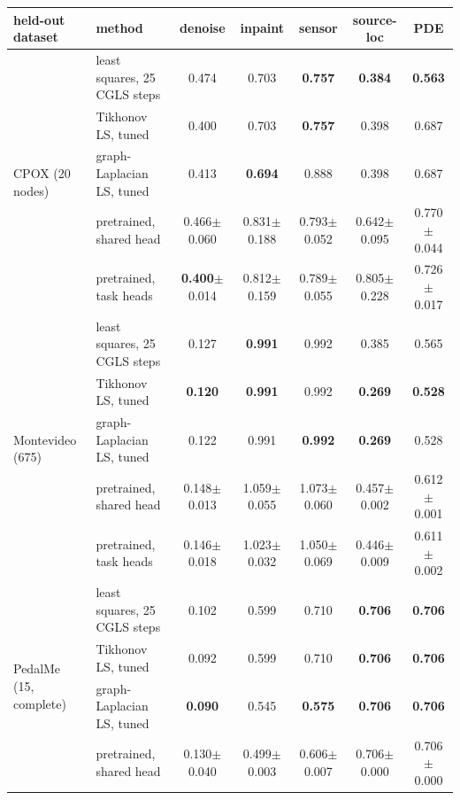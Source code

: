\begin{tabular}{llccccc}
\toprule
held-out dataset & method & denoise & inpaint & sensor & source-loc & PDE \\
\midrule
\multirow{5}{*}{CPOX (20 nodes)} & least squares, 25 CGLS steps & 0.474 & 0.703 & \textbf{0.757} & \textbf{0.384} & \textbf{0.563} \\
 & Tikhonov LS, tuned & 0.400 & 0.703 & \textbf{0.757} & 0.398 & 0.687 \\
 & graph-Laplacian LS, tuned & 0.413 & \textbf{0.694} & 0.888 & 0.398 & 0.687 \\
 & pretrained, shared head & 0.466{\scriptsize$\pm$0.060} & 0.831{\scriptsize$\pm$0.188} & 0.793{\scriptsize$\pm$0.052} & 0.642{\scriptsize$\pm$0.095} & 0.770{\scriptsize$\pm$0.044} \\
 & pretrained, task heads & \textbf{0.400}{\scriptsize$\pm$0.014} & 0.812{\scriptsize$\pm$0.159} & 0.789{\scriptsize$\pm$0.055} & 0.805{\scriptsize$\pm$0.228} & 0.726{\scriptsize$\pm$0.017} \\
\midrule
\multirow{5}{*}{Montevideo (675)} & least squares, 25 CGLS steps & 0.127 & \textbf{0.991} & 0.992 & 0.385 & 0.565 \\
 & Tikhonov LS, tuned & \textbf{0.120} & \textbf{0.991} & 0.992 & \textbf{0.269} & \textbf{0.528} \\
 & graph-Laplacian LS, tuned & 0.122 & 0.991 & \textbf{0.992} & \textbf{0.269} & 0.528 \\
 & pretrained, shared head & 0.148{\scriptsize$\pm$0.013} & 1.059{\scriptsize$\pm$0.055} & 1.073{\scriptsize$\pm$0.060} & 0.457{\scriptsize$\pm$0.002} & 0.612{\scriptsize$\pm$0.001} \\
 & pretrained, task heads & 0.146{\scriptsize$\pm$0.018} & 1.023{\scriptsize$\pm$0.032} & 1.050{\scriptsize$\pm$0.069} & 0.446{\scriptsize$\pm$0.009} & 0.611{\scriptsize$\pm$0.002} \\
\midrule
\multirow{5}{*}{PedalMe (15, complete)} & least squares, 25 CGLS steps & 0.102 & 0.599 & 0.710 & \textbf{0.706} & \textbf{0.706} \\
 & Tikhonov LS, tuned & 0.092 & 0.599 & 0.710 & \textbf{0.706} & \textbf{0.706} \\
 & graph-Laplacian LS, tuned & \textbf{0.090} & 0.545 & \textbf{0.575} & \textbf{0.706} & \textbf{0.706} \\
 & pretrained, shared head & 0.130{\scriptsize$\pm$0.040} & 0.499{\scriptsize$\pm$0.003} & 0.606{\scriptsize$\pm$0.007} & 0.706{\scriptsize$\pm$0.000} & 0.706{\scriptsize$\pm$0.000} \\

\end{tabular}
